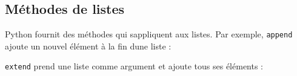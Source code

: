 \hypertarget{muxe9thodes-de-listes}{%
\subsection{Méthodes de listes}\label{muxe9thodes-de-listes}}

Python fournit des méthodes qui s\textquotesingle appliquent aux listes.
Par exemple, \texttt{append} ajoute un nouvel élément à la fin
d\textquotesingle une liste :

\begin{Shaded}
\begin{Highlighting}[]
\OperatorTok{\textgreater{}\textgreater{}\textgreater{}}\OperatorTok{=}\NormalTok{ [}\NormalTok{, }\NormalTok{, }\NormalTok{]}
\OperatorTok{\textgreater{}\textgreater{}\textgreater{}}\NormalTok{)}
\OperatorTok{\textgreater{}\textgreater{}\textgreater{}}
\NormalTok{[}\NormalTok{, }\NormalTok{, }\NormalTok{, }\NormalTok{]}
\end{Highlighting}
\end{Shaded}

\texttt{extend} prend une liste comme argument et ajoute tous ses
éléments :

\begin{Shaded}
\begin{Highlighting}[]
\OperatorTok{\textgreater{}\textgreater{}\textgreater{}}\OperatorTok{=}\NormalTok{ [}\NormalTok{, }\NormalTok{, }\NormalTok{]}
\OperatorTok{\textgreater{}\textgreater{}\textgreater{}}\OperatorTok{=}\NormalTok{ [}\NormalTok{, }\NormalTok{]}
\OperatorTok{\textgreater{}\textgreater{}\textgreater{}}
\OperatorTok{\textgreater{}\textgreater{}\textgreater{}}
\NormalTok{[}\NormalTok{, }\NormalTok{, }\NormalTok{, }\NormalTok{, }\NormalTok{]}
\end{Highlighting}
\end{Shaded}

